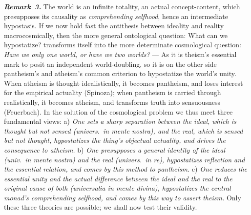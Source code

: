\documentclass[12pt]{book}
\newcommand{\anm}[1]{\emph{\textbf{Remark~#1.}}}
\begin{document}
\anm{3} The world is an infinite totality, an actual concept-content, which
presupposes its causality as \emph{comprehending selfhood}, hence an
intermediate hypostasis. If we now hold fast the antithesis between ideality
and reality macrocosmically, then the more general ontological question:
What can we hypostatize? transforms itself into the more determinate
cosmological question: \emph{Have we only one world, or have we two
worlds?} --- As it is theism's essential mark to posit an independent
world-doubling, so it is on the other side pantheism's and atheism's common
criterion to hypostatize the world's unity. When atheism is thought
idealistically, it becomes pantheism, and loses interest for the empirical
actuality (Spinoza); when pantheism is carried through realistically, it
becomes atheism, and transforms truth into sensuousness (Feuerbach). In the
solution of the cosmological problem we thus meet three fundamental views:
a) \emph{One sets a sharp separation between the ideal, which is thought but
not sensed \textit{(univers.\ in mente nostra)}, and the real, which is
sensed but not thought, hypostatizes the thing's objectual actuality, and
drives the consequence to atheism.} b) \emph{One presupposes a general
identity of the ideal \textit{(univ.\ in mente nostra)} and the real
\textit{(univers.\ in re)}, hypostatizes reflection and the essential
relation, and comes by this method to pantheism.} c) \emph{One reduces the
essential unity and the actual difference between the ideal and the real to
the original cause of both \textit{(universalia in mente divina)},
hypostatizes the central monad's comprehending selfhood, and comes by this
way to assert theism.} Only these three theories are possible; we shall now
test their validity.
\end{document}
